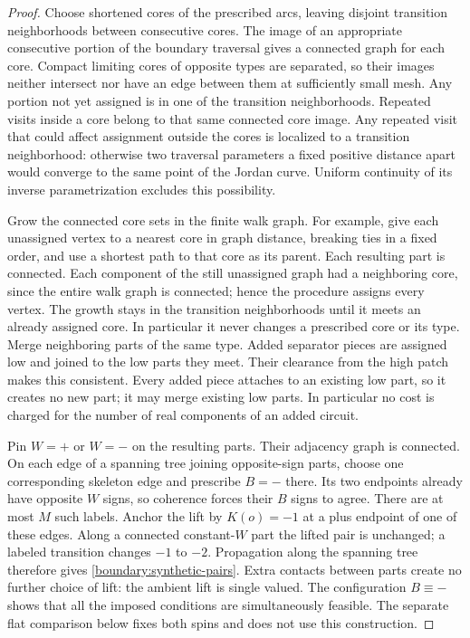 \begin{proof}
Choose shortened cores of the prescribed arcs, leaving disjoint
transition neighborhoods between consecutive cores.  The image of an
appropriate consecutive portion of the boundary traversal gives a
connected graph for each core.  Compact limiting cores of opposite
types are separated, so their images neither intersect nor have an
edge between them at sufficiently small mesh.  Any portion not yet
assigned is in one of the transition neighborhoods.  Repeated visits
inside a core belong to that same connected core image.  Any repeated
visit that could affect assignment outside the cores is localized to
a transition neighborhood: otherwise two traversal parameters a fixed
positive distance apart would converge to the same point of the Jordan
curve.  Uniform continuity of its inverse parametrization excludes
this possibility.

Grow the connected core sets in the finite walk graph.  For example,
give each unassigned vertex to a nearest core in graph distance,
breaking ties in a fixed order, and use a shortest path to that core
as its parent.  Each resulting part is connected.  Each component of
the still unassigned graph had a neighboring core, since the entire
walk graph is connected; hence the procedure assigns every vertex.
The growth stays in the transition neighborhoods until it meets an
already assigned core.  In particular it never changes a prescribed
core or its type.  Merge neighboring parts of the same type.  Added
separator pieces are assigned low and joined to the low parts they
meet.  Their clearance from the high patch makes this consistent.
Every added piece attaches to an existing low part, so it creates no
new part; it may merge existing low parts.  In particular no cost is
charged for the number of real components of an added circuit.

Pin $W=+$ or $W=-$ on the resulting parts.  Their adjacency graph is
connected.  On each edge of a spanning tree joining opposite-sign
parts, choose one corresponding skeleton edge and prescribe $B=-$
there.  Its two endpoints already have opposite $W$ signs, so
coherence forces their $B$ signs to agree.  There are at most $M$
such labels.  Anchor the lift by $K(o)=-1$ at a plus endpoint of one
of these edges.  Along a connected constant-$W$ part the lifted pair
is unchanged; a labeled transition changes $-1$ to $-2$.  Propagation
along the spanning tree therefore gives
\eqref{boundary:synthetic-pairs}.  Extra contacts between parts create
no further choice of lift: the ambient lift is single valued.  The
configuration $B\equiv-$ shows that all the imposed conditions are
simultaneously feasible.  The separate flat comparison below fixes
both spins and does not use this construction.


\end{proof}
